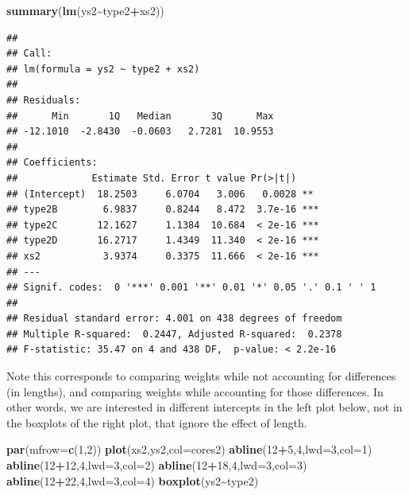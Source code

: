 \documentclass[
]{book}
\newenvironment{Shaded}{\begin{snugshade}}{\end{snugshade}}
\newcommand{\AttributeTok}[1]{\textcolor[rgb]{0.13,0.29,0.53}{#1}}
\newcommand{\DecValTok}[1]{\textcolor[rgb]{0.00,0.00,0.81}{#1}}
\newcommand{\FunctionTok}[1]{\textcolor[rgb]{0.13,0.29,0.53}{\textbf{#1}}}
\newcommand{\NormalTok}[1]{#1}
\newcommand{\SpecialCharTok}[1]{\textcolor[rgb]{0.81,0.36,0.00}{\textbf{#1}}}
\begin{document}
\begin{Shaded}
\begin{Highlighting}[]
\FunctionTok{summary}\NormalTok{(}\FunctionTok{lm}\NormalTok{(ys2}\SpecialCharTok{\textasciitilde{}}\NormalTok{type2}\SpecialCharTok{+}\NormalTok{xs2))}
\end{Highlighting}
\end{Shaded}

\begin{verbatim}
## 
## Call:
## lm(formula = ys2 ~ type2 + xs2)
## 
## Residuals:
##      Min       1Q   Median       3Q      Max 
## -12.1010  -2.8430  -0.0603   2.7281  10.9553 
## 
## Coefficients:
##             Estimate Std. Error t value Pr(>|t|)    
## (Intercept)  18.2503     6.0704   3.006   0.0028 ** 
## type2B        6.9837     0.8244   8.472  3.7e-16 ***
## type2C       12.1627     1.1384  10.684  < 2e-16 ***
## type2D       16.2717     1.4349  11.340  < 2e-16 ***
## xs2           3.9374     0.3375  11.666  < 2e-16 ***
## ---
## Signif. codes:  0 '***' 0.001 '**' 0.01 '*' 0.05 '.' 0.1 ' ' 1
## 
## Residual standard error: 4.001 on 438 degrees of freedom
## Multiple R-squared:  0.2447, Adjusted R-squared:  0.2378 
## F-statistic: 35.47 on 4 and 438 DF,  p-value: < 2.2e-16
\end{verbatim}

Note this corresponds to comparing weights while not accounting for differences (in lengths), and comparing weights while accounting for those differences. In other words, we are interested in different intercepts in the left plot below, not in the boxplots of the right plot, that ignore the effect of length.

\begin{Shaded}
\begin{Highlighting}[]
\FunctionTok{par}\NormalTok{(}\AttributeTok{mfrow=}\FunctionTok{c}\NormalTok{(}\DecValTok{1}\NormalTok{,}\DecValTok{2}\NormalTok{))}
\FunctionTok{plot}\NormalTok{(xs2,ys2,}\AttributeTok{col=}\NormalTok{cores2)}
\FunctionTok{abline}\NormalTok{(}\DecValTok{12}\SpecialCharTok{+}\DecValTok{5}\NormalTok{,}\DecValTok{4}\NormalTok{,}\AttributeTok{lwd=}\DecValTok{3}\NormalTok{,}\AttributeTok{col=}\DecValTok{1}\NormalTok{)}
\FunctionTok{abline}\NormalTok{(}\DecValTok{12}\SpecialCharTok{+}\DecValTok{12}\NormalTok{,}\DecValTok{4}\NormalTok{,}\AttributeTok{lwd=}\DecValTok{3}\NormalTok{,}\AttributeTok{col=}\DecValTok{2}\NormalTok{)}
\FunctionTok{abline}\NormalTok{(}\DecValTok{12}\SpecialCharTok{+}\DecValTok{18}\NormalTok{,}\DecValTok{4}\NormalTok{,}\AttributeTok{lwd=}\DecValTok{3}\NormalTok{,}\AttributeTok{col=}\DecValTok{3}\NormalTok{)}
\FunctionTok{abline}\NormalTok{(}\DecValTok{12}\SpecialCharTok{+}\DecValTok{22}\NormalTok{,}\DecValTok{4}\NormalTok{,}\AttributeTok{lwd=}\DecValTok{3}\NormalTok{,}\AttributeTok{col=}\DecValTok{4}\NormalTok{)}
\FunctionTok{boxplot}\NormalTok{(ys2}\SpecialCharTok{\textasciitilde{}}\NormalTok{type2)}
\end{Highlighting}
\end{Shaded}
\end{document}
